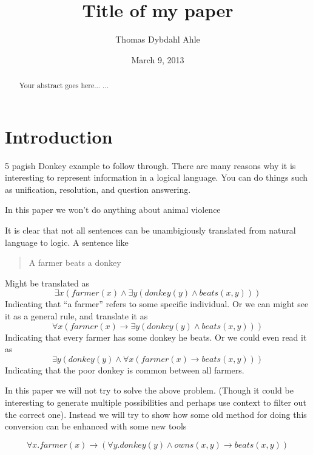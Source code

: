 \documentclass[12pt]{article}
\title{Title of my paper}
\author{Thomas Dybdahl Ahle}
\date{March 9, 2013}
\let\stdsection\section
\renewcommand\section{\newpage\stdsection}
\begin{document}
\maketitle

\begin{abstract}
Your abstract goes here...
...
\end{abstract}

\tableofcontents

\section{Introduction}
5 pagish Donkey example to follow through. There are many reasons why it is interesting to represent information in a logical language. You can do things such as unification, resolution, and question answering.

In this paper we won't do anything about animal violence

It is clear that not all sentences can be unambigiously translated from natural language to logic. A sentence like 	
\begin{quotation}
A farmer beats a donkey
\end{quotation}
Might be translated as 
\begin{equation}
\exists x ( farmer(x) \wedge \exists y ( donkey(y) \wedge beats(x,y)))
\end{equation}
Indicating that ``a farmer'' refers to some specific individual. Or we can might see it as a general rule, and translate it as
\begin{equation}
\forall x ( farmer(x) \rightarrow \exists y ( donkey(y) \wedge beats(x,y)))
\end{equation}
Indicating that every farmer has some donkey he beats. Or we could even read it as
\begin{equation}
\exists y ( donkey(y) \wedge \forall x ( farmer(x) \rightarrow beats(x,y)))
\end{equation}
Indicating that the poor donkey is common between all farmers.

In this paper we will not try to solve the above problem. (Though it could be interesting to generate multiple possibilities and perhaps use context to filter out the correct one). Instead we will try to show how some old method for doing this conversion can be enhanced with some new tools

\begin{equation}
\forall x . farmer(x) \rightarrow (\forall y . donkey(y) \wedge owns(x,y) \rightarrow beats(x,y))
\end{equation}
\end{document}
